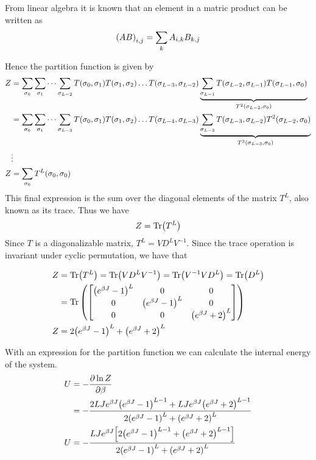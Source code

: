 \documentclass[12pt]{article}
\begin{document}
From linear algebra it is known that an element in a matric product can be
written as
\begin{align*}
    \qty(AB)_{i,j} = \sum_k A_{i, k}B_{k, j}
\end{align*}

Hence the partition function is given by
\begin{align*}
    Z &= \sum_{\sigma_0}\sum_{\sigma_1}\dots\sum_{\sigma_{L-2}}
    T\qty(\sigma_0, \sigma_1)T\qty(\sigma_1, \sigma_2)\dots T\qty(\sigma_{L-3},
    \sigma_{L-2}) \underbrace{\sum_{\sigma_{L-1}}T\qty(\sigma_{L-2},
    \sigma_{L-1})T\qty(\sigma_{L-1}, \sigma_0)}_{T^2\qty(\sigma_{L-2},
    \sigma_0)} \\
    &= \sum_{\sigma_0}\sum_{\sigma_1}\dots\sum_{\sigma_{L-3}}T\qty(\sigma_0,
    \sigma_1)T\qty(\sigma_1, \sigma_2)\dots T\qty(\sigma_{L-4}, \sigma_{L-3})
    \underbrace{\sum_{\sigma_{L-2}}T\qty(\sigma_{L-3},
    \sigma_{L-2})T^2\qty(\sigma_{L-2}, \sigma_0)}_{T^3\qty(\sigma_{L-3},
    \sigma_0)} \\
    &\vdots \\
    Z &= \sum_{\sigma_0}T^L\qty(\sigma_0, \sigma_0)
\end{align*}
This final expression is the sum over the diagonal elements of the matrix
    $T^L$, also known as its trace. Thus we have
\begin{align*}
    Z = \Tr(T^L)
\end{align*}
Since $T$ is a diagonalizable matrix, $T^L = VD^LV^{-1}$. Since the trace
operation is invariant under cyclic permutation, we have that

\begin{align*}
    Z &= \Tr(T^L) = \Tr(VD^LV^{-1}) = \Tr(V^{-1}VD^L) = \Tr(D^L) \\
    &= \Tr\qty(\begin{bmatrix}\qty(e^{\beta J}-1)^L&0&0 \\ 0&\qty(e^{\beta
    J}-1)^L&0 \\ 0&0&\qty(e^{\beta J} + 2)^L\end{bmatrix}) \\
    Z &= 2\qty(e^{\beta J}-1)^L + \qty(e^{\beta J} + 2)^L
\end{align*}

With an expression for the partition function we can calculate the internal
energy of the system.
\begin{align*}
    U &= -\pdv{\ln Z}{\beta} \\
    &= -\frac{2LJe^{\beta J}\qty(e^{\beta J}-1)^{L-1} + LJe^{\beta J}\qty(e^{\beta
    J}+2)^{L-1}}{2\qty(e^{\beta J}-1)^L + \qty(e^{\beta J} + 2)^L} \\
    U &= -\frac{LJe^{\beta J}\qty[2\qty(e^{\beta J}-1)^{L-1} + \qty(e^{\beta J} +
    2)^{L-1}]}{2\qty(e^{\beta J}-1)^L + \qty(e^{\beta J} + 2)^L}
\end{align*}
\end{document}
